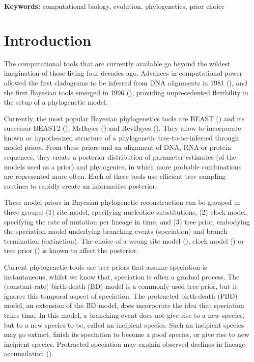 \documentclass{article}
\begin{document}
{\bf Keywords:} computational biology, evolution, phylogenetics, prior choice

\section{Introduction}

The computational tools that are currently available go beyond the wildest 
imagination of those living four decades ago.
Advances in computational power allowed the first cladograms to be inferred 
from DNA alignments in 1981 (\cite{felsenstein1981}), and  
the first Bayesian tools emerged in 1996 (\cite{rannala1996}),
providing unprecedented flexibility in the setup of a phylogenetic model.

Currently, the most popular Bayesian phylogenetics tools are BEAST (\cite{beast})
and its successor BEAST2 (\cite{beast2}), MrBayes (\cite{mrbayes}) and RevBayes (\cite{revbayes}). 
They allow to incorporate known or hypothesized structure of a phylogenetic 
tree-to-be-inferred through model priors. 
From these priors and an alignment of DNA, RNA or protein sequences, they create a posterior distribution
of parameter estimates (of the models used as a prior) and phylogenies, 
in which more probable combinations are represented more often.
Each of these tools use efficient tree sampling routines to rapidly create an 
informative posterior.

These model priors in Bayesian phylogenetic reconstruction 
can be grouped in three groups: (1) site model, specifying 
nucleotide substitutions, (2) clock model, specifying
the rate of mutation per lineage in time, and (3) tree prior, embodying
the speciation model underlying branching events (speciation) 
and branch termination (extinction).
The choice of a wrong site model (\cite{posada_and_bucklet_2004}), 
clock model (\cite{baele_et_al_2012}) 
or tree prior (\cite{moller2018, yang_and_ranalla_2005}) is known to affect
the posterior.

Current phylogenetic tools use tree priors 
that assume speciation is instantaneous, whilst we know that, 
speciation is often a gradual process.
The (constant-rate) birth-death (BD) model is a commonly 
used tree prior, but it ignores this temporal aspect of speciation.
The protracted birth-death (PBD) model, an extension of 
the BD model, does incorporate the idea that speciation takes time.
In this model, a branching event does not give rise to a new species, but to
a new species-to-be, called an incipient species. Such an incipient
species may go extinct, finish its speciation to become a good species, or give
rise to new incipient species. Protracted speciation may explain observed 
declines in lineage accumulation (\cite{etienne_and_rosindell_2012}).
\end{document}
